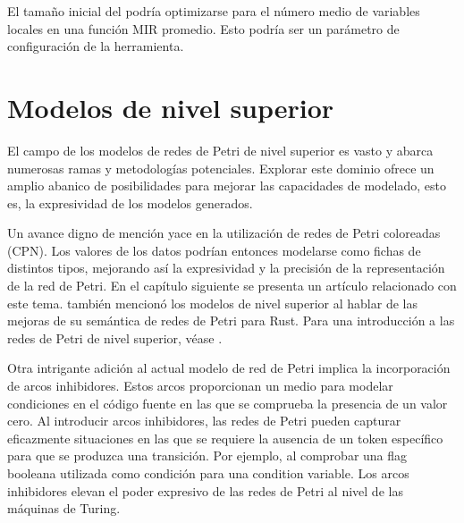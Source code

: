 El tamaño inicial del  podría optimizarse para el número medio de
variables locales en una función \acrshort{MIR} promedio. Esto podría ser un parámetro de configuración de
la herramienta.

\section{Modelos de nivel superior}
\label{sec:future-work-higher-level-models}

El campo de los modelos de redes de Petri de nivel superior es vasto y abarca numerosas ramas y
metodologías potenciales. Explorar este dominio ofrece un amplio abanico de posibilidades para
mejorar las capacidades de modelado, esto es, la expresividad de los modelos generados.

Un avance digno de mención yace en la utilización de redes de Petri coloreadas (\acrfull{CPN}).
Los valores de los datos podrían entonces modelarse como fichas de distintos tipos, mejorando así la
expresividad y la precisión de la representación de la red de Petri. En el capítulo siguiente se
presenta un artículo relacionado con este tema.
\cite{meyer2020} también mencionó los modelos
de nivel superior al hablar de las mejoras de su semántica de redes de Petri para Rust.
Para una introducción a las redes de Petri de nivel superior, véase \cite{murata1989}.

Otra intrigante adición al actual modelo de red de Petri implica la incorporación de arcos
inhibidores. Estos arcos proporcionan un medio para modelar condiciones en el código fuente
en las que se comprueba la presencia de un valor cero. Al introducir arcos inhibidores, las redes
de Petri pueden capturar eficazmente situaciones en las que se requiere la ausencia de un token
específico para que se produzca una transición. Por ejemplo, al comprobar una flag
booleana utilizada como condición para una condition variable. Los arcos inhibidores
elevan el poder expresivo de las redes de Petri al nivel de las máquinas de Turing\cite{peterson1981}.